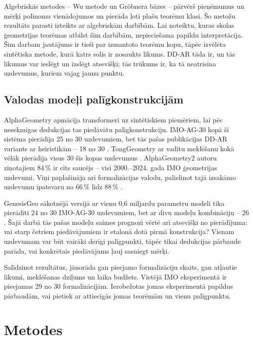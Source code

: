 \documentclass[nolabels]{../template/zpd}
\begin{document}
Algebriskās metodes -- Wu metode  un Gröbnera bāzes  --
pārvērš pieņēmumus un mērķi polinomu vienādojumos un pierāda ļoti plašu teorēmu klasi. Šo metožu
rezultāts parasti izteikts ar algebriskām darbībām. Lai noteiktu, kuras skolas ģeometrijas teorēmas atbilst šīm darbībām, nepieciešama papildu interpretācija. Šim darbam jautājums ir tieši par izmantoto teorēmu kopu, tāpēc
izvēlēta sintētiska metode, kurā katrs solis ir nosaukts likums. DD-AR tāda ir, un tās likumus var
ieslēgt un izslēgt atsevišķi; tās trūkums ir, ka tā neatrisina uzdevumus, kuriem vajag jaunu punktu.

\subsection{Valodas modeļi palīgkonstrukcijām}
AlphaGeometry apmācīja transformeri uz sintētiskiem piemēriem, lai pēc nesekmīgas dedukcijas
tas piedāvātu palīgkonstrukciju. IMO-AG-30 kopā šī sistēma pierādīja 25 no 30 uzdevumiem,
bet tās pašas publikācijas DD-AR variants ar heiristikām -- 18 no 30
. TongGeometry ar vadītu meklēšanu kokā vēlāk pierādīja visus
30 šīs kopas uzdevumus . AlphaGeometry2 autoru ziņotajiem
84\,\% ir cits saucējs -- visi 2000.--2024. gada IMO ģeometrijas uzdevumi.
Viņi paplašināja arī formalizācijas valodu, palielinot tajā izsakāmo uzdevumu īpatsvaru
no 66\,\% līdz 88\,\% .

GenesisGeo sākotnējā versijā ar vienu 0,6 miljardu parametru modeli tika pierādīti
24 no 30 IMO-AG-30 uzdevumiem, bet ar divu modeļu kombināciju -- 26
. Šajā darbā tās pašas modeļu saimes prognozi vērtē arī
atsevišķi no pierādījuma: vai starp četriem piedāvājumiem ir etalonā dotā pirmā konstrukcija?
Vienam uzdevumam var būt vairāki derīgi palīgpunkti, tāpēc tikai dedukcijas pārbaude parāda,
vai konkrētais piedāvājums ļauj sasniegt mērķi.

Salīdzinot rezultātus, jānorāda gan pieejamo formalizāciju skaits,
gan atļautie likumi, meklēšanas dziļums un laika budžets. Vietējā IMO eksperimentā ir pieejamas
29 no 30 formalizācijām. Ierobežotas jomas eksperimentā papildus pārbaudām, vai pietiek ar
attiecīgās jomas teorēmām un vienu palīgpunktu.

\section{Metodes}
\end{document}

